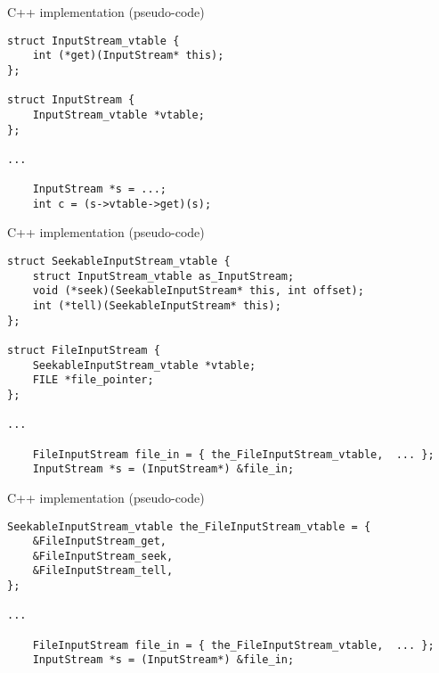 \begin{frame}[fragile,label=CPPImpl]{C++ implementation (pseudo-code)}
\lstset{
    language=C,style=smaller,
}
\vspace{-.5cm}
\begin{lstlisting}
struct InputStream_vtable {
    int (*get)(InputStream* this);
};

struct InputStream {
    InputStream_vtable *vtable;
};

...

    InputStream *s = ...;
    int c = (s->vtable->get)(s);
\end{lstlisting}
\end{frame}

\begin{frame}[fragile,label=CPPImplB]{C++ implementation (pseudo-code)}
\lstset{
    language=C,style=smaller,
}
\vspace{-.5cm}
\begin{lstlisting}
struct SeekableInputStream_vtable {
    struct InputStream_vtable as_InputStream;
    void (*seek)(SeekableInputStream* this, int offset);
    int (*tell)(SeekableInputStream* this);
};

struct FileInputStream {
    SeekableInputStream_vtable *vtable;
    FILE *file_pointer;
};

...

    FileInputStream file_in = { the_FileInputStream_vtable,  ... };
    InputStream *s = (InputStream*) &file_in;
\end{lstlisting}
\end{frame}

\begin{frame}[fragile,label=CPPImplC]{C++ implementation (pseudo-code)}
\lstset{
    language=C,style=smaller,
}
\vspace{-.5cm}
\begin{lstlisting}
SeekableInputStream_vtable the_FileInputStream_vtable = {
    &FileInputStream_get,
    &FileInputStream_seek,
    &FileInputStream_tell,
};

...

    FileInputStream file_in = { the_FileInputStream_vtable,  ... };
    InputStream *s = (InputStream*) &file_in;
\end{lstlisting}
\end{frame}


